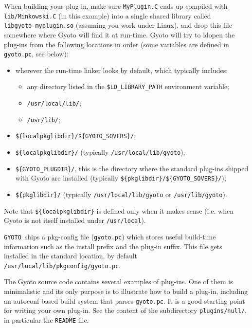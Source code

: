 \documentclass[a4paper,12pt]{article}
\newcommand{\GYOTO}{\texttt{GYOTO}}
\begin{document}
When building your plug-in, make sure \texttt{MyPlugin.C} ends up
compiled with\\ \texttt{lib/Minkowski.C} (in this example) into a
single shared library called\\ \texttt{libgyoto-myplugin.so} (assuming
you work under Linux), and drop this file somewhere where Gyoto
will find it at run-time. Gyoto will try to ldopen the plug-ins from
the following locations in order (some variables are defined in
\texttt{gyoto.pc}, see below):
\begin{itemize}
\item wherever the run-time linker looks by default, which typically
  includes:
  \begin{itemize}
  \item any directory listed in the \texttt{\$LD\_LIBRARY\_PATH}
    environment variable;
  \item \texttt{/usr/local/lib/};
  \item \texttt{/usr/lib/};
  \end{itemize}
\item \texttt{\$\{localpkglibdir\}/\$\{GYOTO\_SOVERS\}/};
\item \texttt{\$\{localpkglibdir\}/} (typically \texttt{/usr/local/lib/gyoto});
\item \texttt{\$\{GYOTO\_PLUGDIR\}/}, this is the directory where the
  standard plug-ins shipped with Gyoto are installed (typically
  \texttt{\$\{pkglibdir\}/\$\{GYOTO\_SOVERS\}/});
\item \texttt{\$\{pkglibdir\}/} (typically
  \texttt{/usr/local/lib/gyoto} or \texttt{/usr/lib/gyoto}).
\end{itemize}
Note that \texttt{\$\{localpkglibdir\}} is defined only when it makes
sense (i.e. when Gyoto is not itself installed under \texttt{/usr/local}).

\GYOTO\ ships a pkg-config file (\texttt{gyoto.pc}) which stores
useful build-time information such as the install prefix and the
plug-in suffix. This file gets installed in the standard location, by
default \texttt{/usr/local/lib/pkgconfig/gyoto.pc}.

The Gyoto source code contains several examples of plug-ins. One of
them is minimalistic and its only purpose is to illustrate how to
build a plug-in, including an autoconf-based build system that parses
\texttt{gyoto.pc}. It is a good starting point for writing your own
plug-in. See the content of the subdirectory \texttt{plugins/null/},
in particular the \texttt{README} file.
\end{document}
